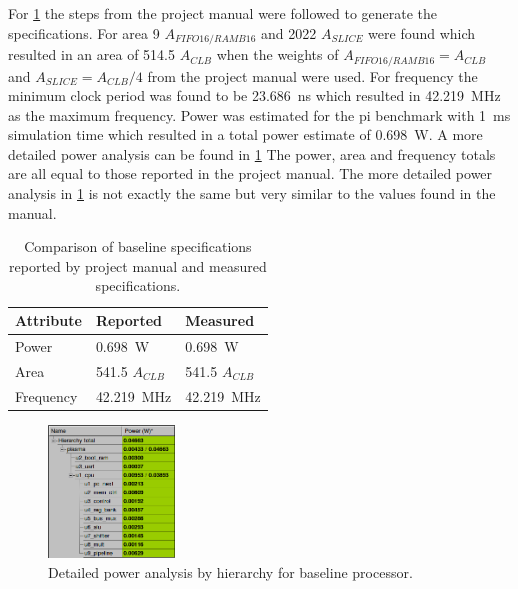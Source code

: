 \documentclass[final]{article}
\begin{document}
For \cref{tab:baselineperformance} the steps from the project manual were followed to generate the specifications.
For area 9 $A_{FIFO16/RAMB16}$ and 2022 $A_{SLICE}$ were found which resulted in an area of 514.5 $A_{CLB}$ when the weights of $A_{FIFO16/RAMB16} = A_{CLB}$ and $A_{SLICE} = A_{CLB}/4$ from the project manual were used.
For frequency the minimum clock period was found to be \SI{23.686}{\nano\second} which resulted in \SI{42.219}{\mega\hertz} as the maximum frequency.
Power was estimated for the pi benchmark with \SI{1}{\milli\second} simulation time which resulted in a total power estimate of \SI{0.698}{\watt}.
A more detailed power analysis can be found in \cref{fig:baselinepower}
The power, area and frequency totals are all equal to those reported in the project manual.
The more detailed power analysis in \cref{fig:baselinepower} is not exactly the same but very similar to the values found in the manual.

\begin{table}[H]
    \centering
    \caption{Comparison of baseline specifications reported by project manual and measured specifications.}
    \label{tab:baselineperformance}
    \begin{tabular}{lll}
        \toprule
        \textbf{Attribute} & \textbf{Reported} & \textbf{Measured} \\
        \midrule
        Power    &  \SI{0.698}{\watt}        &   \SI{0.698}{\watt}                \\
        Area     &       \num{541.5} $A_{CLB}$            & \num{541.5} $A_{CLB}$             \\
        Frequency    &   \SI{42.219}{\mega\hertz}           &  \SI{42.219}{\mega\hertz}                         \\
        \bottomrule
    \end{tabular}

\end{table}

\begin{figure}[H]
\centering
\includegraphics[width=0.3\textwidth]{resources/baselinepower.png}
\caption{Detailed power analysis by hierarchy for baseline processor.}
\label{fig:baselinepower}
\end{figure}
\end{document}
